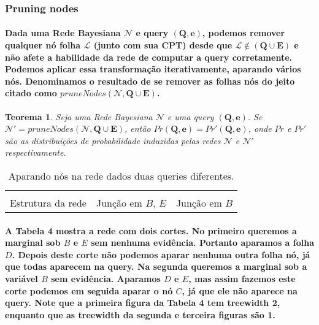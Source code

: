 \documentclass[a4paper,10pt]{article}
\theoremstyle{plain}
\newtheorem*{spn-thm}{Teorema}
\begin{document}
\subsubsection{Pruning nodes}

\paragraph{
  Dada uma Rede Bayesiana $\mathcal{N}$ e query $(\textbf{Q}, \textbf{e})$, podemos remover
  qualquer nó folha $\mathcal{L}$ (junto com sua CPT) desde que $\mathcal{L} \notin (\mathbf{Q}
  \cup \mathbf{E})$ e não afete a habilidade da rede de computar a query corretamente. Podemos
  aplicar essa transformação iterativamente, aparando vários nós. Denominamos o resultado de se
  remover as folhas nós do jeito citado como $pruneNodes(\mathcal{N}, \mathbf{Q} \cup \mathbf{E})$.
}

\begin{spn-thm} Seja uma Rede Bayesiana $\mathcal{N}$ e uma query $(\mathbf{Q}, \mathbf{e})$. Se
  $\mathcal{N}' = pruneNodes(\mathcal{N}, \mathbf{Q} \cup \mathbf{E})$, então $Pr(\mathbf{Q},
  \mathbf{e}) = Pr'(\mathbf{Q}, \mathbf{e})$, onde $Pr$ e $Pr'$ são as distribuições de
  probabilidade induzidas pelas redes $\mathcal{N}$ e $\mathcal{N}'$ respectivamente.
\end{spn-thm}

\begin{table}[h]
  \begin{center}
    \captionsetup{justification=centering}
    \begin{tabular}{c c c}
       &  &  \\
      Estrutura da rede & Junção em $B$, $E$ & Junção em $B$ \\
    \end{tabular}
    \caption{Aparando nós na rede dados duas queries diferentes.}
  \end{center}
\end{table}

\paragraph{
  A Tabela 4 mostra a rede com dois cortes. No primeiro queremos a marginal sob $B$ e $E$ sem
  nenhuma evidência. Portanto aparamos a folha $D$. Depois deste corte não podemos aparar nenhuma
  outra folha nó, já que todas aparecem na query. Na segunda queremos a marginal sob a variável $B$
  sem evidência. Aparamos $D$ e $E$, mas assim fazemos este corte podemos em seguida aparar o nó
  $C$, já que ele não aparece na query. Note que a primeira figura da Tabela 4 tem treewidth 2,
  enquanto que as treewidth da segunda e terceira figuras são 1.
}
\end{document}
